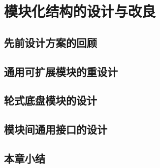 
\chapter{模块化结构的设计与改良}
\label{chap:mechanicalSystem}

\section{先前设计方案的回顾}
\section{通用可扩展模块的重设计}
\section{轮式底盘模块的设计}
\section{模块间通用接口的设计}
\section{本章小结}

